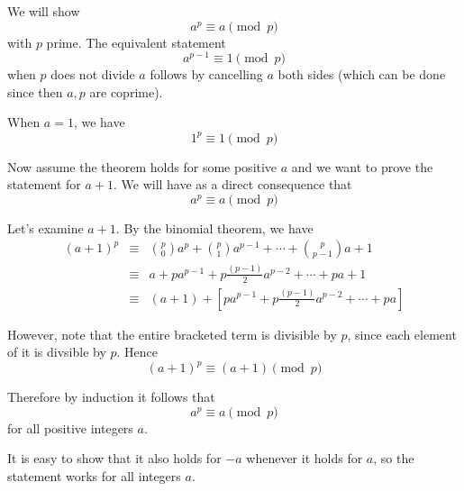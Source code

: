 \documentclass{article}
\newcommand{\binomial}[2]{{{#1}\choose{#2}}}
\begin{document}
We will show $$a^{p} \equiv a \pmod{p}$$ with $p$ prime. The equivalent statement $$a^{p-1}\equiv 1 \pmod{p}$$ when $p$ does not divide $a$ follows by cancelling $a$ both sides (which can be done since then $a,p$ are coprime).

When $a=1$, we have $$ 1^{p} \equiv 1 \pmod{p}$$  

Now assume the theorem holds for some positive $a$ and we want to prove the statement for $a+1$. We will have as a direct consequence that 
$$a^p \equiv a \pmod{p}$$

Let's examine $a+1$.  By the binomial theorem, we have
\begin{eqnarray*}
(a+1)^{p} & \equiv & \binomial{p}{0}a^p + \binomial{p}{1}a^{p-1} + \cdots + \binomial{p}{p-1} a + 1  \\
& \equiv & a + pa^{p-1} + p\frac{(p-1)}{2}a^{p-2} + \cdots + p a + 1 \\
& \equiv & (a + 1) + [ pa^{p-1} + p \frac{(p-1)}{2}a^{p-2} + \cdots + p a ] 
\end{eqnarray*}

However, note that the entire bracketed term is divisible by $p$, since each element of it is divsible by $p$.  Hence
$$(a+1)^p \equiv (a+1) \pmod{p}$$

Therefore by induction it follows that
\[a^p\equiv a \pmod{p}\]
for all positive integers $a$.

It is easy to show that it also holds for $-a$ whenever it holds for $a$, so the statement works for all integers $a$.
\end{document}
